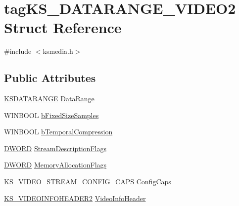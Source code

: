 \hypertarget{structtag_k_s___d_a_t_a_r_a_n_g_e___v_i_d_e_o2}{}\section{tag\+K\+S\+\_\+\+D\+A\+T\+A\+R\+A\+N\+G\+E\+\_\+\+V\+I\+D\+E\+O2 Struct Reference}
\label{structtag_k_s___d_a_t_a_r_a_n_g_e___v_i_d_e_o2}


{\ttfamily \#include $<$ksmedia.\+h$>$}

\subsection*{Public Attributes}
\begin{DoxyCompactItemize}
\item 
\hyperlink{ks_8h_a1ea8bc535eaf96036403dc325623b469}{K\+S\+D\+A\+T\+A\+R\+A\+N\+GE} \hyperlink{structtag_k_s___d_a_t_a_r_a_n_g_e___v_i_d_e_o2_adf8201d04d2f86cbcb19876379434384}{Data\+Range}
\item 
W\+I\+N\+B\+O\+OL \hyperlink{structtag_k_s___d_a_t_a_r_a_n_g_e___v_i_d_e_o2_a6fd471a708c6afa22d5f748e7c13df95}{b\+Fixed\+Size\+Samples}
\item 
W\+I\+N\+B\+O\+OL \hyperlink{structtag_k_s___d_a_t_a_r_a_n_g_e___v_i_d_e_o2_a6f2131aa10765590850d855f1b148819}{b\+Temporal\+Compression}
\item 
\hyperlink{mapinls_8h_ad342ac907eb044443153a22f964bf0af}{D\+W\+O\+RD} \hyperlink{structtag_k_s___d_a_t_a_r_a_n_g_e___v_i_d_e_o2_a5417b1bfc198f166829228913633a1a6}{Stream\+Description\+Flags}
\item 
\hyperlink{mapinls_8h_ad342ac907eb044443153a22f964bf0af}{D\+W\+O\+RD} \hyperlink{structtag_k_s___d_a_t_a_r_a_n_g_e___v_i_d_e_o2_a054954e3f1f1e66d5556ed3b270b3f16}{Memory\+Allocation\+Flags}
\item 
\hyperlink{ksmedia_8h_a6206e1a832fffa713842974c34128ade}{K\+S\+\_\+\+V\+I\+D\+E\+O\+\_\+\+S\+T\+R\+E\+A\+M\+\_\+\+C\+O\+N\+F\+I\+G\+\_\+\+C\+A\+PS} \hyperlink{structtag_k_s___d_a_t_a_r_a_n_g_e___v_i_d_e_o2_a87fa1d28a2e0b429ddba42904fee8e66}{Config\+Caps}
\item 
\hyperlink{ksmedia_8h_a505f5a953699cb697dc04dace56b49d5}{K\+S\+\_\+\+V\+I\+D\+E\+O\+I\+N\+F\+O\+H\+E\+A\+D\+E\+R2} \hyperlink{structtag_k_s___d_a_t_a_r_a_n_g_e___v_i_d_e_o2_ab7792921199be45e7619151a99a6620b}{Video\+Info\+Header}
\end{DoxyCompactItemize}


